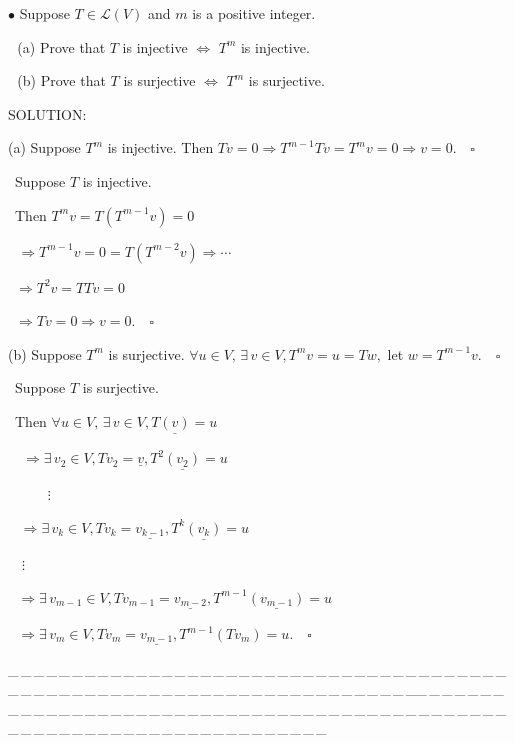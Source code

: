 \documentclass[a4paper, 11pt, UTF8]{article}
\def\Lm{\mathcal{L}}
\begin{document}
\begin{large}
{\small $\bullet$} {\timessl\Large 
Suppose $T\in\Lm(V)$ and $m$ is a positive integer.}\par\,\,
(a) {\timessl\Large Prove that $T$ is injective $\Longleftrightarrow$ $T^m$ is injective.}\par\,\,
(b) {\timessl\Large Prove that $T$ is surjective $\Longleftrightarrow$ $T^m$ is surjective.}\par
{\timesbf S\footnotesize{OLUTION:}}\par\quad
(a) Suppose $T^m$ is injective. Then $Tv=0\Rightarrow T^{m-1} Tv=T^m v=0\Rightarrow v=0.\quad\square$\par\qquad\,
Suppose $T$ is injective.\par\qquad\,
Then $T^m v=T(T^{m-1}v)=0$\par\qquad\qquad\qquad\,\quad\,
$\Rightarrow T^{m-1}v=0=T(T^{m-2}v)\Rightarrow\cdots$\par\qquad\quad\,
$\Rightarrow T^2v=TTv=0$\par\qquad\quad\,
$\Rightarrow Tv=0\Rightarrow v=0.\quad\square$\par\quad
(b) Suppose $T^m$ is surjective. $\forall u\in V,\,\exists\,v\in V,T^m v=u=Tw,$ let $w=T^{m-1}v.\quad\square$\par\qquad\,
Suppose $T$ is surjective.\par\qquad\,
Then $\forall u\in V,\,\exists\,v\in V, T\underline{(v)}=u$\par\qquad\qquad\,\,\,\,
$\Rightarrow\exists\,v_2\in V,Tv_2=\underline{v}, T^2\underline{(v_2)}=u$
\par\qquad\qquad\qquad\qquad\qquad\qquad\quad\,
$\qquad\,\,\vdots$\par\qquad\qquad\qquad\,\,\,
$\Rightarrow\exists\,v_k\in V,Tv_k=\underline{v_{k-1}}, T^{k}\underline{(v_k)}=u$\par\quad\qquad\qquad\qquad\qquad\qquad\qquad\qquad\qquad\quad\,\,
$\,\,\vdots$\par\qquad\qquad\qquad\quad\,\,
$\Rightarrow\exists\,v_{m-1}\in V,Tv_{m-1}=\underline{v_{m-2}}, T^{m-1}\underline{(v_{m-1})}=u$\par\qquad\qquad\qquad\qquad\qquad\qquad\qquad\,\,
$\Rightarrow\exists\,v_m\in V,Tv_m=\underline{v_{m-1}}, T^{m-1}(Tv_{m})=u.\quad\square$\par
{\tiny \_\,\_\,\_\,\_\,\_\,\_\,\_\,\_\,\_\,\_\,\_\,\_\,\_\,\_\,\_\,\_\,\_\,\_\,\_\,\_\,\_\,\_\,\_\,\_\,\_\,\_\,\_\,\_\,\_\,\_\,\_\,\_\,\_\,\_\,\_\,\_\,\_\,\_\,\_\,\_\,\_\,\_\,\_\,\_\,\_\,\_\,\_\,\_\,\_\,\_\,\_\,\_\,\_\,\_\,\_\,\_\,\_\,\_\,\_\,\_\,\_\,\_\,\_\,\_\,\_\,\_\,\_\,\_\,\_\,\_\,\_\_\,\_\,\_\,\_\,\_\,\_\,\_\,\_\,\_\,\_\,\_\,\_\,\_\,\_\,\_\,\_\,\_\,\_\,\_\,\_\,\_\,\_\,\_\,\_\,\_\,\_\,\_\,\_\,\_\,\_\,\_\,\_\,\_\,\_\,\_\,\_\,\_\,\_\,\_\,\_\,\_\,\_\,\_\,\_\,\_\,\_\,\_\,\_\,\_\,\_\,\_\,\_\,\_\,\_\,\_\,\_\,\_\,\_\,\_\,\_\,\_\,\_\,\_\,\_\,\_\,\_\,\_\,\_\,\_\,\_\,\_}{\small\par}


\end{large}
\end{document}
